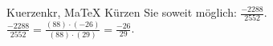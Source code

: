 \begin{MAufgabe}{Kuerzen}{kr, MaTeX}
K\"urzen Sie soweit m\"oglich: $\frac{-2288}{2552}$.\\ 
\ifLsg\MLoesung
\quad $\frac{-2288}{2552}=\frac{(88)\cdot(-26)}{(88)\cdot(29)}=\frac{-26}{29}$.\else\relax\fi
 \end{MAufgabe}